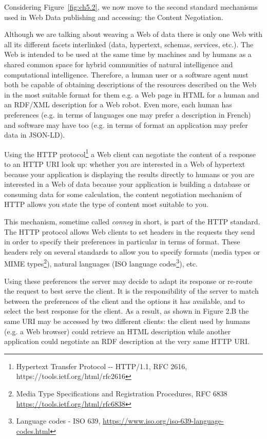 Considering Figure~\ref{fig:ch5.2}, we now move to the second standard mechanisms used
in Web Data publishing and accessing: the Content Negotiation.

Although we are talking about weaving a Web of data there is only one
Web with all its different facets interlinked (data, hypertext, schemas,
services, etc.). The Web is intended to be used at the same time by
machines and by humans as a shared common space for hybrid communities
of natural intelligence and computational intelligence. Therefore, a
human user or a software agent must both be capable of obtaining
descriptions of the resources described on the Web in the most suitable
format for them e.g. a Web page in HTML for a human and an RDF/XML
description for a Web robot. Even more, each human has preferences (e.g.
in terms of languages one may prefer a description in French) and
software may have too (e.g. in terms of format an application may prefer
data in JSON-LD).

Using the HTTP protocol\footnote{Hypertext Transfer Protocol -\/-
  HTTP/1.1, RFC 2616, https://tools.ietf.org/html/rfc2616} a Web client
can negotiate the content of a response to an HTTP URI look up: whether
you are interested in a Web of hypertext because your application is
displaying the results directly to humans or you are interested in a Web
of data because your application is building a database or consuming
data for some calculation, the content negotiation mechanism of HTTP
allows you state the type of content most suitable to you.

This mechanism, sometime called \emph{conneg} in short, is part of the
HTTP standard. The HTTP protocol allows Web clients to set headers in
the requests they send in order to specify their preferences in
particular in terms of format. These headers rely on several standards
to allow you to specify formats (media types or MIME types\footnote{Media
  Type Specifications and Registration Procedures, RFC 6838
  \url{https://tools.ietf.org/html/rfc6838}}), natural languages (ISO
language codes\footnote{Language codes - ISO 639,
  \url{https://www.iso.org/iso-639-language-codes.html}}), etc.

Using these preferences the server may decide to adapt its response or
re-route the request to best serve the client. It is the responsibility
of the server to match between the preferences of the client and the
options it has available, and to select the best response for the
client. As a result, as shown in Figure 2.B the same URI may be accessed
by two different clients: the client used by humans (e.g. a Web browser)
could retrieve an HTML description while another application could
negotiate an RDF description at the very same HTTP URI.

